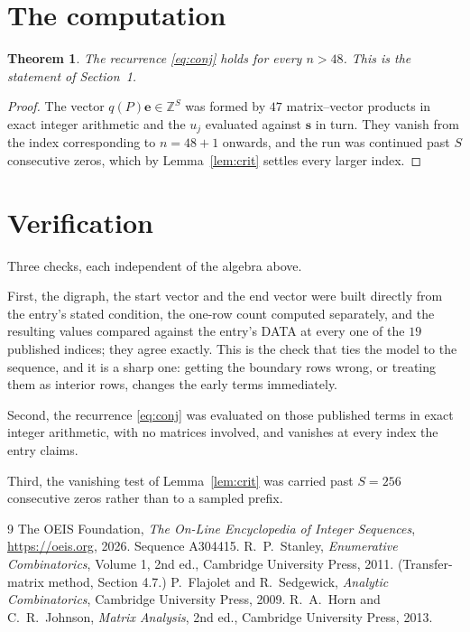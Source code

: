 \documentclass[11pt,a4paper]{article}
\theoremstyle{plain}
\newtheorem{theorem}{Theorem}
\theoremstyle{definition}
\begin{document}
\section{The computation}

\begin{theorem}
The recurrence \eqref{eq:conj} holds for every $n>48$. This is the statement of
Section~1.
\end{theorem}

\begin{proof}
The vector $q(P)\mathbf{e}\in\mathbb{Z}^{S}$ was formed by $47$ matrix--vector
products in exact integer arithmetic and the $u_j$ evaluated against $\mathbf{s}$ in turn.
They vanish from the index corresponding to $n=48+1$ onwards, and the run was continued
past $S$ consecutive zeros, which by Lemma~\ref{lem:crit} settles every larger index.
\end{proof}

\section{Verification}

Three checks, each independent of the algebra above.

First, the digraph, the start vector and the end vector were built directly from the
entry's stated condition, the one-row count computed separately, and the resulting values
compared against the entry's DATA at every one of the $19$ published indices; they
agree exactly. This is the check that ties the model to the sequence, and it is a sharp one:
getting the boundary rows wrong, or treating them as interior rows, changes the early terms
immediately.

Second, the recurrence \eqref{eq:conj} was evaluated on those published terms in exact
integer arithmetic, with no matrices involved, and vanishes at every index the entry claims.

Third, the vanishing test of Lemma~\ref{lem:crit} was carried past $S=256$ consecutive
zeros rather than to a sampled prefix.

\begin{thebibliography}{9}
 The OEIS Foundation, \emph{The On-Line Encyclopedia of Integer
Sequences}, \url{https://oeis.org}, 2026. Sequence A304415.
 R.~P.~Stanley, \emph{Enumerative Combinatorics}, Volume 1, 2nd ed.,
Cambridge University Press, 2011. (Transfer-matrix method, Section 4.7.)
 P.~Flajolet and R.~Sedgewick, \emph{Analytic Combinatorics}, Cambridge
University Press, 2009.
 R.~A.~Horn and C.~R.~Johnson, \emph{Matrix Analysis}, 2nd ed., Cambridge
University Press, 2013.
\end{thebibliography}
\end{document}
